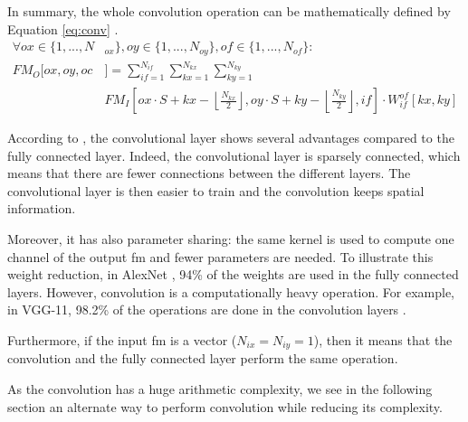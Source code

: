 In summary, the whole convolution operation can be mathematically defined by Equation \eqref{eq:conv} \cite{abdelouahab_accelerating_2018}.
%
{\small
\begin{equation}
    \begin{split}
        \forall ox \in \{ 1, ..., N&_{ox} \}, oy \in \{ 1, ..., N_{oy} \}, of \in \{ 1, ..., N_{of} \}: \\
        FM_O[ox, oy, oc&] = \sum^{N_{if}}_{if=1}
        \sum^{N_{kx}}_{kx=1}
        \sum^{N_{ky}}_{ky=1}\\
        & FM_I \left[ ox \cdot S + kx - \left\lfloor \frac{N_{kx}}{2} \right\rfloor,  oy \cdot S + ky - \left\lfloor \frac{N_{ky}}{2} \right\rfloor, if \right] \cdot
        W^{of}_{if} \left[ kx, ky \right]
    \end{split}
    \label{eq:conv}
\end{equation}
}

According to \textcite{goodfellow_deep_2016}, the convolutional layer shows several advantages compared to the fully connected layer. Indeed, the convolutional layer is sparsely connected, which means that there are fewer connections between the different layers. The convolutional layer is then easier to train and the convolution keeps spatial information. 

Moreover, it has also parameter sharing: the same kernel is used to compute one channel of the output \acrshort{fm} and fewer parameters are needed. To illustrate this weight reduction, in AlexNet \cite{krizhevsky_imagenet_2012}, 94\% of the weights are used in the fully connected layers. However, convolution is a computationally heavy operation. For example, in VGG-11, 98.2\% of the operations are done in the convolution layers \cite{guo_survey_2018}. 

Furthermore, if the input \acrshort{fm} is a vector ($N_{ix} = N_{iy} = 1$), then it means that the convolution and the fully connected layer perform the same operation.

As the convolution has a huge arithmetic complexity, we see in the following section an alternate way to perform convolution while reducing its complexity.
